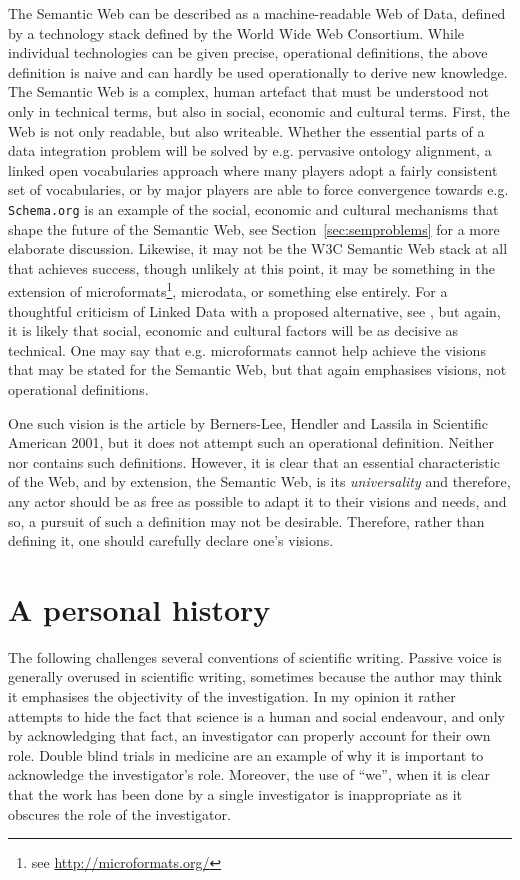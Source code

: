 The Semantic Web can be described as a machine-readable Web of Data,
defined by a technology stack defined by the World Wide Web
Consortium. While individual technologies can be given precise,
operational definitions, the above definition is naive and can hardly
be used operationally to derive new knowledge. The Semantic Web is a
complex, human artefact that must be understood not only in technical
terms, but also in social, economic and cultural terms. First, the Web
is not only readable, but also writeable. Whether the essential parts
of a data integration problem will be solved by e.g. pervasive
ontology alignment, a linked open vocabularies approach where many
players adopt a fairly consistent set of vocabularies, or by major
players are able to force convergence towards e.g. \texttt{Schema.org}
is an example of the social, economic and cultural mechanisms that
shape the future of the Semantic Web, see
Section~\ref{sec:semproblems} for a more elaborate
discussion. Likewise, it may not be the W3C Semantic Web stack at all
that achieves success, though unlikely at this point, it may be
something in the extension of microformats\footnote{see
  \url{http://microformats.org/}}, microdata\cite{microdata}, or
something else entirely. For a thoughtful criticism of Linked Data
with a proposed alternative, see \cite{darobin1}, but again, it is
likely that social, economic and cultural factors will be as decisive
as technical. One may say that e.g. microformats cannot help achieve
the visions that may be stated for the Semantic Web, but that again
emphasises visions, not operational definitions.

One such vision is the article by Berners-Lee, Hendler and Lassila in
Scientific American 2001\cite{berners2001semantic}, but it does not attempt such an
operational definition. Neither \cite{semwebroadmap} nor \cite{berners2000weaving} contains
such definitions. However, it is clear that an essential
characteristic of the Web, and by extension, the Semantic Web, is its
\emph{universality} and therefore, any actor should be as free as
possible to adapt it to their visions and needs, and so, a pursuit of
such a definition may not be desirable. Therefore, rather than
defining it, one should carefully declare one's visions.

\section{A personal history}\label{sec:history}

The following challenges several conventions of scientific
writing. Passive voice is generally overused in scientific writing,
sometimes because the author may think it emphasises the objectivity
of the investigation. In my opinion it rather attempts to hide the
fact that science is a human and social endeavour, and only by
acknowledging that fact, an investigator can properly account for
their own role. Double blind trials in medicine are an example of why
it is important to acknowledge the investigator's role. Moreover, the
use of ``we'', when it is clear that the work has been done by a
single investigator is inappropriate as it obscures
the role of the investigator. 

